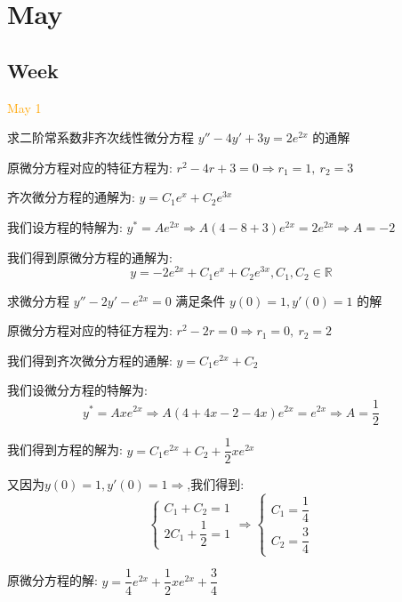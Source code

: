 \chapter{May}
\section{Week }
\textcolor{orange}{May 1}

\begin{example}[][Exam: 31.1.1]
	求二阶常系数非齐次线性微分方程 $y''-4y'+3y=2e^{2x}$ 的通解
\end{example}

\begin{solution}
	
	原微分方程对应的特征方程为: $r^2-4r+3=0\Rightarrow r_{1}=1,\ r_{2}=3$
	
	齐次微分方程的通解为: $y=C_{1}e^{x}+C_{2}e^{3x}$
	
	我们设方程的特解为: $y^{*}=Ae^{2x}\Rightarrow A(4-8+3)e^{2x}=2e^{2x}\Rightarrow A=-2$
	
	我们得到原微分方程的通解为: 
	$$y=-2e^{2x}+C_{1}e^{x}+C_{2}e^{3x},C_{1},C_{2}\in\mathbb{R}$$
\end{solution}

\begin{example}[][Exam: 31.1.2]
	求微分方程 $y''-2y'-e^{2x}=0$ 满足条件 $y(0)=1,y'(0)=1$ 的解
\end{example}

\begin{solution}
	
	原微分方程对应的特征方程为: $r^2-2r=0\Rightarrow r_{1}=0,\ r_{2}=2$
	
	我们得到齐次微分方程的通解: $y=C_{1}e^{2x}+C_{2}$
	
	我们设微分方程的特解为: $$y^{*}=Axe^{2x}\Rightarrow A(4+4x-2-4x)e^{2x}=e^{2x}\Rightarrow A=\frac{1}{2}$$
	
	我们得到方程的解为: $y=C_{1}e^{2x}+C_{2}+\dfrac{1}{2}xe^{2x}$
	
	又因为$y(0)=1,y'(0)=1\Rightarrow$,我们得到: 
	$$\left\lbrace 
	\begin{array}{l}
		C_{1}+C_{2}=1\\
		2C_{1}+\dfrac{1}{2}=1
	\end{array}
	\right. \Rightarrow \left\lbrace 
	\begin{array}{l}
		C_{1}=\dfrac{1}{4}\\
		C_{2}=\dfrac{3}{4}
	\end{array}
	\right. $$
	
	原微分方程的解: $y=\dfrac{1}{4}e^{2x}+\dfrac{1}{2}xe^{2x}+\dfrac{3}{4}$
\end{solution}

